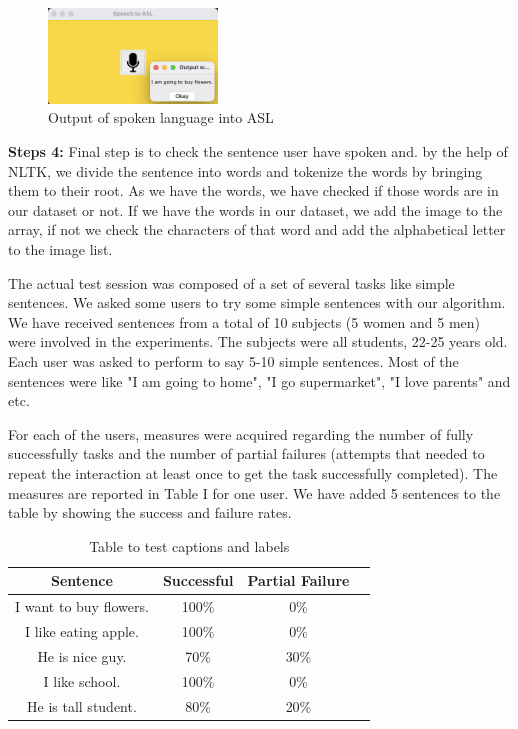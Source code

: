 \documentclass[twocolumn,10pt]{asme2ej}
\begin{document}
\begin{figure}[h]
    \centering
    \includegraphics[width=0.4\textwidth]{figure/output_speech.png}
    \caption{Output of spoken language into ASL}
    \label{fig:mesh1}
\end{figure}

{\bf Steps 4:} Final step is to check the sentence user have spoken and. by the help of NLTK, we divide the sentence into words and tokenize the words by bringing them to their root. As we have the words, we have checked if those words are in our dataset or not. If we have the words in our dataset, we add the image to the array, if not we check the characters of that word and add the alphabetical letter to the image list. 

The actual test session was composed of a set of several tasks like simple sentences. We asked some users to try some simple sentences with our algorithm. We have received sentences from a total of 10 subjects (5 women and 5 men) were involved in the experiments. The subjects were all students, 22-25 years old. Each user was asked to perform to say 5-10 simple sentences. Most of the sentences were like "I am going to home", "I go supermarket", "I love parents" and etc. 

For each of the users, measures were acquired regarding the number of fully successfully tasks and the number of partial failures (attempts that needed to repeat the interaction at least once to get the task successfully completed). The measures are reported in Table I for one user. We have added 5 sentences to the table by showing the success and failure rates. 

\begin{table}[h!]
\begin{center}
\begin{tabular}{ |c|c|c|c| } 
\hline
{\bf Sentence} & {\bf Successful} & {\bf Partial Failure} \\
\hline
I want to buy flowers. & 100\% & 0\% \\ 
I like eating apple. & 100\% & 0\% \\ 
He is nice guy. & 70\% & 30\% \\ 
I like school. & 100\% & 0\% \\ 
He is tall student. & 80\% & 20\% \\ 
\hline
\end{tabular}
\end{center}
\caption{Table to test captions and labels}
\label{table:1}
\end{table}
\end{document}

